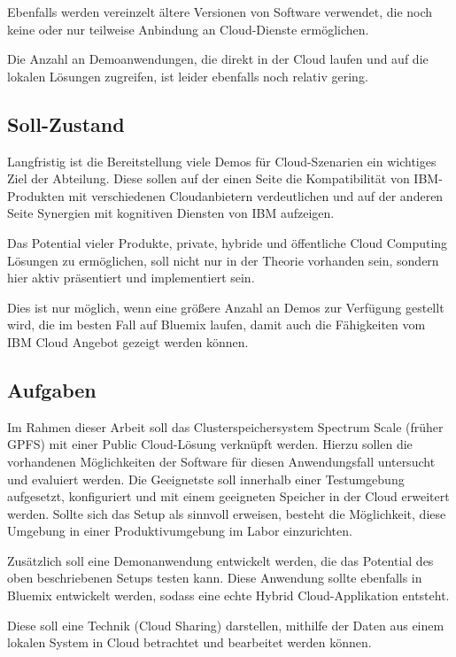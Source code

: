 Ebenfalls werden vereinzelt ältere Versionen von Software verwendet, die noch keine oder nur teilweise Anbindung an Cloud-Dienste ermöglichen. 

Die Anzahl an Demoanwendungen, die direkt in der Cloud laufen und auf die lokalen Lösungen zugreifen, ist leider ebenfalls noch relativ gering. 

\subsection{Soll-Zustand}

Langfristig ist die Bereitstellung viele Demos für Cloud-Szenarien ein wichtiges Ziel der Abteilung. Diese sollen auf der einen Seite die Kompatibilität von IBM-Produkten mit verschiedenen Cloudanbietern verdeutlichen und auf der anderen Seite Synergien mit kognitiven Diensten von IBM aufzeigen.

Das Potential vieler Produkte, private, hybride und öffentliche Cloud Computing Lösungen zu ermöglichen, soll nicht nur in der Theorie vorhanden sein, sondern hier aktiv präsentiert und implementiert sein.

Dies ist nur möglich, wenn eine größere Anzahl an Demos zur Verfügung gestellt wird, die im besten Fall auf \gls{Bluemix} laufen, damit auch die Fähigkeiten vom IBM Cloud Angebot gezeigt werden können. 

\subsection{Aufgaben}

Im Rahmen dieser Arbeit soll das Clusterspeichersystem Spectrum Scale (früher GPFS) mit einer Public Cloud-Lösung verknüpft werden. Hierzu sollen die vorhandenen Möglichkeiten der Software für diesen Anwendungsfall untersucht und evaluiert werden.
Die Geeignetste soll innerhalb einer Testumgebung aufgesetzt, konfiguriert und mit einem geeigneten Speicher in der Cloud erweitert werden. 
Sollte sich das Setup als sinnvoll erweisen, besteht die Möglichkeit, diese Umgebung in einer Produktivumgebung im Labor einzurichten.

Zusätzlich soll eine Demonanwendung entwickelt werden, die das Potential des oben beschriebenen Setups testen kann. Diese Anwendung sollte ebenfalls in \gls{Bluemix} entwickelt werden, sodass eine echte Hybrid Cloud-Applikation entsteht. 

Diese soll eine Technik (Cloud Sharing) darstellen, mithilfe der Daten aus einem lokalen System in Cloud betrachtet und bearbeitet werden können.


